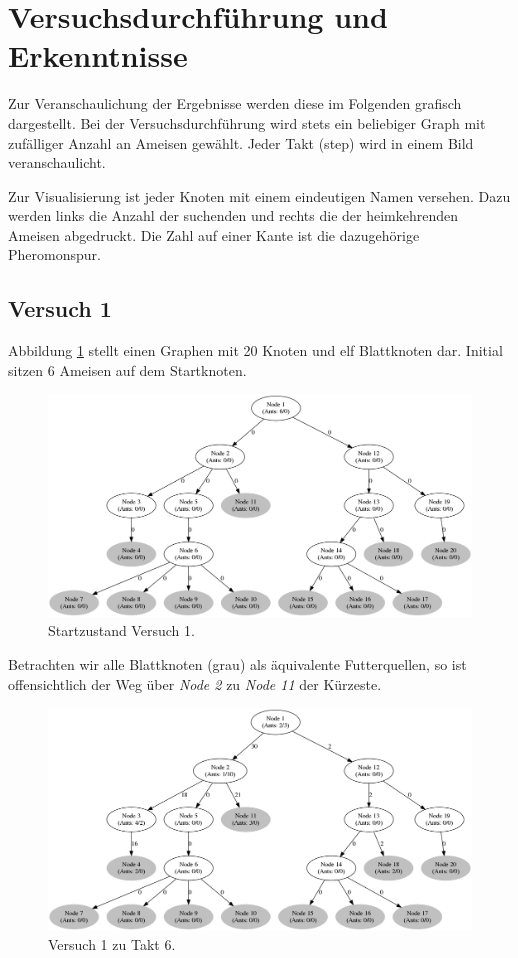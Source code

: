 
\section{Versuchsdurchführung und Erkenntnisse}
\label{sec:versuch}

Zur Veranschaulichung der Ergebnisse werden diese im Folgenden grafisch dargestellt.
Bei der Versuchsdurchführung wird stets ein beliebiger Graph mit zufälliger Anzahl an Ameisen gewählt. Jeder Takt (step) wird in einem Bild veranschaulicht.\par
Zur Visualisierung ist jeder Knoten mit einem eindeutigen Namen versehen.
Dazu werden links die Anzahl der suchenden und rechts die der heimkehrenden Ameisen abgedruckt.
Die Zahl auf einer Kante ist die dazugehörige Pheromonspur.

\subsection{Versuch 1}
Abbildung \ref{fig:v1} stellt einen Graphen mit 20 Knoten und elf Blattknoten dar. Initial sitzen 6 Ameisen auf dem Startknoten.

\begin{figure}[htbp]
	\includegraphics[width=.9\textwidth]{images/v1_1.png}
	\caption{Startzustand Versuch 1.}
	\label{fig:v1}
\end{figure}

Betrachten wir alle Blattknoten (grau) als äquivalente Futterquellen, so ist offensichtlich der Weg über \emph{Node 2} zu \emph{Node 11} der Kürzeste.

\begin{figure}[htbp]
	\includegraphics[width=.9\textwidth]{images/v1_6.png}
	\caption{Versuch 1 zu Takt 6.}
	\label{fig:v1_6}
\end{figure}


